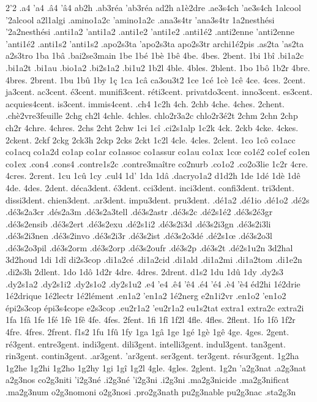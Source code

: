2'2
.a4
'a4
.â4
'â4
ab2h
.ab3réa
'ab3réa
ad2h
a1è2dre
.ae3s4ch
'ae3s4ch
1alcool
'2alcool
a2l1algi
.amino1a2c
'amino1a2c
.ana3s4tr
'ana3s4tr
1a2nesthési
'2a2nesthési
.anti1a2
'anti1a2
.anti1e2
'anti1e2
.anti1é2
.anti2enne
'anti2enne
'anti1é2
.anti1s2
'anti1s2
.apo2s3ta
'apo2s3ta
apo2s3tr
archi1é2pis
.as2ta
'as2ta
a2s3tro
1ba
1bâ
.bai2se3main
1be
1bé
1bè
1bê
4be.
4bes.
2bent.
1bi
1bî
.bi1a2c
.bi1a2t
.bi1au
.bio1a2
.bi2s1a2
.bi1u2
1b2l
4ble.
4bles.
2blent.
1bo
1bô
1b2r
4bre.
4bres.
2brent.
1bu
1bû
1by
1ç
1ca
1câ
ca3ou3t2
1ce
1cé
1cè
1cê
4ce.
4ces.
2cent.
ja3cent.
ac3cent.
é3cent.
munifi3cent.
réti3cent.
privatdo3cent.
inno3cent.
es3cent.
acquies4cent.
is3cent.
immis4cent.
.ch4
1c2h
4ch.
2chb
4che.
4ches.
2chent.
.chè2vre3feuille
2chg
ch2l
4chle.
4chles.
chlo2r3a2c
chlo2r3é2t
2chm
2chn
2chp
ch2r
4chre.
4chres.
2chs
2cht
2chw
1ci
1cî
.ci2s1alp
1c2k
4ck.
2ckb
4cke.
4ckes.
2ckent.
2ckf
2ckg
2ck3h
2ckp
2cks
2ckt
1c2l
4cle.
4cles.
2clent.
1co
1cô
co1acc
co1acq
co1a2d
co1ap
co1ar
co1assoc
co1assur
co1au
co1ax
1cœ
co1é2
co1ef
co1en
co1ex
.con4
.cons4
.contre1s2c
.contre3maître
co2nurb
.co1o2
.co2o3lie
1c2r
4cre.
4cres.
2crent.
1cu
1cû
1cy
.cul4
1d'
1da
1dâ
.dacryo1a2
d1d2h
1de
1dé
1dè
1dê
4de.
4des.
2dent.
déca3dent.
é3dent.
cci3dent.
inci3dent.
confi3dent.
tri3dent.
dissi3dent.
chien3dent.
.ar3dent.
impu3dent.
pru3dent.
%
.dé1a2
.dé1io
.dé1o2
.dé2s
.dé3s2a3cr
.dés2a3m
.dé3s2a3tell
.dé3s2astr
.dé3s2c
.dé2s1é2
.dé3s2é3gr
.dé3s2ensib
.dé3s2ert
.dé3s2exu
.dé2s1i2
.dé3s2i3d
.dé3s2i3gn
.dé3s2i3li
.dé3s2i3nen
.dé3s2invo
.dé3s2i3r
.dé3s2ist
.dé3s2o3dé
.dé2s1œ
.dé3s2o3l
.dé3s2o3pil
.dé3s2orm
.dé3s2orp
.dé3s2oufr
.dé3s2p
.dé3s2t
.dé2s1u2n
3d2hal
3d2houd
1di
1dî
di2s3cop
.di1a2cé
.di1a2cid
.di1ald
.di1a2mi
.di1a2tom
.di1e2n
.di2s3h
2dlent.
1do
1dô
1d2r
4dre.
4dres.
2drent.
d1s2
1du
1dû
1dy
.dy2s3
.dy2s1a2
.dy2s1i2
.dy2s1o2
.dy2s1u2
.e4
'e4
.ê4
'ê4
.é4
'é4
.è4
'è4
éd2hi
1é2drie
1é2drique
1é2lectr
1é2lément
.en1a2
'en1a2
1é2nerg
e2n1i2vr
.en1o2
'en1o2
épi2s3cop
épi3s4cope
e2s3cop
.eu2r1a2
'eu2r1a2
eu1s2tat
extra1
extra2c
extra2i
1fa
1fâ
1fe
1fé
1fè
1fê
4fe.
4fes.
2fent.
1fi
1fî
1f2l
4fle.
4fles.
2flent.
1fo
1fô
1f2r
4fre.
4fres.
2frent.
f1s2
1fu
1fû
1fy
1ga
1gâ
1ge
1gé
1gè
1gê
4ge.
4ges.
2gent.
ré3gent.
entre3gent.
indi3gent.
dili3gent.
intelli3gent.
indul3gent.
tan3gent.
rin3gent.
contin3gent.
.ar3gent.
'ar3gent.
ser3gent.
ter3gent.
résur3gent.
1g2ha
1g2he
1g2hi
1g2ho
1g2hy
1gi
1gî
1g2l
4gle.
4gles.
2glent.
1g2n
'a2g3nat
.a2g3nat
a2g3nos
co2g3niti
'i2g3né
.i2g3né
'i2g3ni
.i2g3ni
.ma2g3nicide
.ma2g3nificat
.ma2g3num
o2g3nomoni
o2g3nosi
.pro2g3nath
pu2g3nable
pu2g3nac
.sta2g3n
